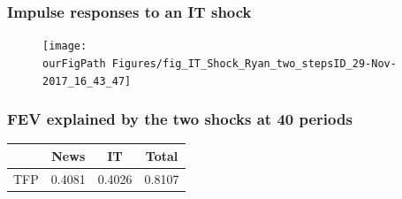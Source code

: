 \documentclass{beamer}
\def \ourFigPath {../../}
\begin{document}
\begin{frame}
	\frametitle{Impulse responses to an IT shock}

\vspace{-1cm}
\noindent
\begin{figure}
\centering
\texttt{[image: \\ourFigPath Figures/fig\_IT\_Shock\_Ryan\_two\_stepsID\_29-Nov-2017\_16\_43\_47]}
\end{figure}

	
	
\end{frame}

\begin{frame}
	\frametitle{FEV explained by the two shocks at 40 periods}


    \hspace{2.25cm}
\begin{large}
	\begin{tabular}{lccc}
	\hline
		& News & IT & Total \\
		\hline
	TFP	           & 0.4081  & 0.4026 & 0.8107  \\
		\hline
	\end{tabular}
\end{large}
		 	
\end{frame}
\end{document}
